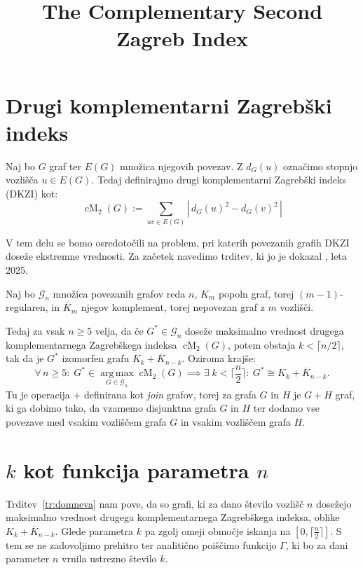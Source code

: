 \documentclass[fin1, tisk]{fmfdelo}
\title{The Complementary Second Zagreb Index}
\newcommand{\KC}{\overline{K}}
\newcommand{\cM}{\operatorname{cM}_2}
\newcommand{\argmax}{\mathop{\mathrm{arg\,max}}\limits}
\begin{document}

\section{Drugi komplementarni Zagrebški indeks}
\begin{definicija}
Naj bo $G$ graf ter $E(G)$ množica njegovih povezav. Z $d_G(u)$ 
označimo stopnjo vozlišča $u \in E(G)$. Tedaj definirajmo drugi 
komplementarni Zagrebški indeks (DKZI) kot:
\begin{equation}
  \cM(G) := \sum_{uv \in E(G)} |\,d_G(u)^2 - d_G(v)^2\,|
\end{equation} 
\end{definicija}

V tem delu se bomo osredotočili na problem, pri katerih povezanih grafih 
DKZI doseže ekstremne vrednosti. Za začetek 
navedimo trditev, ki jo je
dokazal \textcite{proof2025}, leta 2025.

\begin{trditev}\label{tr:domneva}
Naj bo $\mathcal{G}_n$ množica povezanih grafov reda $n$, 
$K_m$ popoln graf, torej $(m-1)$-regularen, in 
$\overline{K}_m$ njegov komplement, torej nepovezan graf z $m$ vozlišči.

Tedaj za vsak $n \geq 5$ velja, da če $G^* \in \mathcal{G}_n$ doseže 
maksimalno vrednost drugega komplementarnega Zagrebškega indeksa 
$\cM(G)$, potem obstaja $k < \lceil n/2 \rceil$, tak da je $G^*$ 
izomorfen grafu $K_k + \overline{K}_{n-k}$. Oziroma krajše:
\begin{equation}
 \forall\, n \geq 5:\; G^* \in \argmax_{G \in \mathcal{G}_n} \cM(G)
  \implies \exists \;k < \lceil \frac{n}{2} \rceil:\  
    G^* \cong K_k + \KC_{n-k}.
\end{equation}
Tu je operacija $+$ definirana kot \emph{join} grafov, torej za grafa $G$ in $H$ je
$G + H$ graf, ki ga dobimo tako, da vzamemo disjunktna grafa $G$ in $H$ 
ter dodamo vse povezave med vsakim vozliščem grafa $G$ in vsakim vozliščem grafa $H$.
\end{trditev}


\section[k kot funkcija parametra n]{$k$ kot funkcija parametra $n$}
Trditev~\ref{tr:domneva} nam pove, da so grafi, ki za 
dano število vozlišč $n$ dosežejo 
maksimalno vrednost drugega komplementarnega Zagrebškega indeksa, oblike 
$K_k + \overline{K}_{n-k}$. Glede parametra $k$ pa zgolj omeji območje iskanja 
na $[0,  \lceil \frac{n}{2} \rceil]$. S tem se ne zadovoljimo prehitro ter 
analitično poiščimo funkcijo $\Gamma$, ki bo za dani parameter $n$ vrnila ustrezno 
število $k$.
\end{document}
